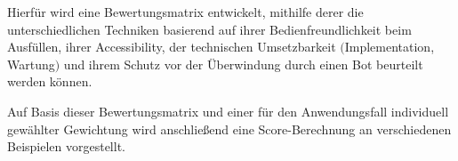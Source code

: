 Hierfür wird eine Bewertungsmatrix entwickelt, mithilfe derer die unterschiedlichen Techniken basierend auf
ihrer Bedienfreundlichkeit beim Ausfüllen, ihrer Accessibility, der technischen Umsetzbarkeit $($Implementation, Wartung$)$ und ihrem Schutz vor der Überwindung durch einen Bot beurteilt werden können.

Auf Basis dieser Bewertungsmatrix und einer für den Anwendungsfall individuell gewählter Gewichtung wird anschließend eine Score-Berechnung 
an verschiedenen Beispielen vorgestellt.